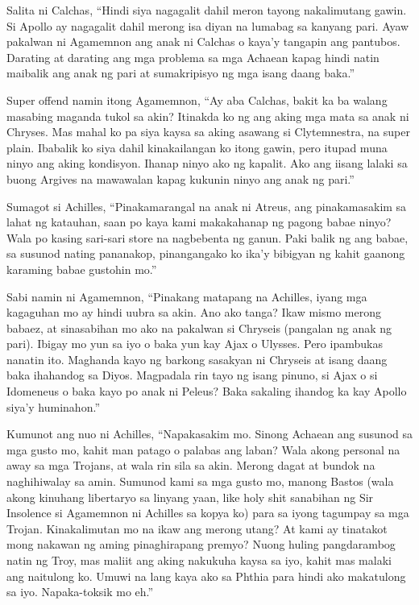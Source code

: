 \documentclass[12pt,letterpaper]{report}
\begin{document}
Salita ni Calchas, ``Hindi siya nagagalit dahil meron tayong nakalimutang gawin. Si Apollo ay nagagalit dahil merong isa diyan na lumabag sa kanyang pari. Ayaw pakalwan ni Agamemnon ang anak ni Calchas o kaya'y tangapin ang pantubos. Darating at darating ang mga problema sa mga Achaean kapag hindi natin maibalik ang anak ng pari at sumakripisyo ng mga isang daang baka.''

Super offend namin itong Agamemnon, ``Ay aba Calchas, bakit ka ba walang masabing maganda tukol sa akin? Itinakda ko ng ang aking mga mata sa anak ni Chryses. Mas mahal ko pa siya kaysa sa aking asawang si Clytemnestra, na super plain. Ibabalik ko siya dahil kinakailangan ko itong gawin, pero itupad muna ninyo ang aking kondisyon. Ihanap ninyo ako ng kapalit. Ako ang iisang lalaki sa buong Argives na mawawalan kapag kukunin ninyo ang anak ng pari.''

Sumagot si Achilles, ``Pinakamarangal na anak ni Atreus, ang pinakamasakim sa lahat ng katauhan, saan po kaya kami makakahanap ng pagong babae ninyo? Wala po kasing sari-sari store na nagbebenta ng ganun. Paki balik ng ang babae, sa susunod nating pananakop, pinangangako ko ika'y bibigyan ng kahit gaanong karaming babae gustohin mo.''

Sabi namin ni Agamemnon, ``Pinakang matapang na Achilles, iyang mga kagaguhan mo ay hindi uubra sa akin. Ano ako tanga? Ikaw mismo merong babaez, at sinasabihan mo ako na pakalwan si Chryseis (pangalan ng anak ng pari). Ibigay mo yun sa iyo o baka yun kay  Ajax o Ulysses. Pero ipambukas nanatin ito. Maghanda kayo ng barkong sasakyan ni Chryseis at isang daang baka ihahandog sa Diyos. Magpadala rin tayo ng isang pinuno, si Ajax o si Idomeneus o baka kayo po anak ni Peleus? Baka sakaling ihandog ka kay Apollo siya'y huminahon.''

Kumunot ang nuo ni Achilles, ``Napakasakim mo. Sinong Achaean ang susunod sa mga gusto mo, kahit man patago o palabas ang laban? Wala akong personal na away sa mga Trojans, at wala rin sila sa akin. Merong dagat at bundok na naghihiwalay sa amin. Sumunod kami sa mga gusto mo, manong Bastos (wala akong kinuhang libertaryo sa linyang yaan, like holy shit sanabihan ng Sir Insolence si Agamemnon ni Achilles sa kopya ko) para sa iyong tagumpay sa mga Trojan. Kinakalimutan mo na ikaw ang merong utang? At kami ay tinatakot mong nakawan ng aming pinaghirapang premyo? Nuong huling pangdarambog natin ng Troy, mas maliit ang aking nakukuha kaysa sa iyo, kahit mas malaki ang naitulong ko. Umuwi na lang kaya ako sa Phthia para hindi ako makatulong sa iyo. Napaka-toksik mo eh.''
\end{document}

